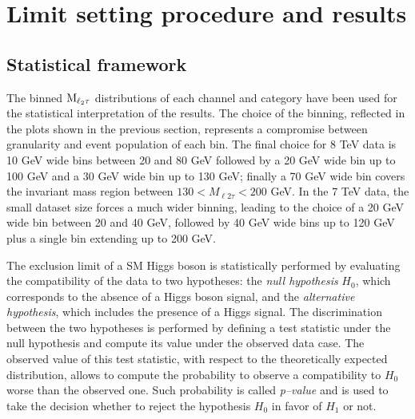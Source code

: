 \begin{table}
\caption{%
Expected event yields for the different background processes and for a 125 GeV WH, $\rm{H}\To\tau\tau$ signal compared to the number of events observed in the data, split by channel and category, for 7 TeV data. The uncertainty quoted on each background process represents statistical plus systematic uncertainty.}

\label{tab:prefit_yields_table_7TeV}
\end{table}


\section{Limit setting procedure and results}

\subsection{Statistical framework}
The binned $\rm{M}_{\ell_2 \tau}$ distributions of each channel and category have been used for the statistical interpretation of the results. The choice of the binning, reflected in the plots shown in the previous section, represents a compromise between granularity and event population of each bin. The final choice for 8 TeV data is 10 GeV wide bins between 20 and 80 GeV followed by a 20 GeV wide bin up to 100 GeV and a 30 GeV wide bin up to 130 GeV; finally a 70 GeV wide bin covers the invariant mass region between $130 < M_{\ell 2 \tau} < 200$ GeV. In the 7 TeV data, the small dataset size forces a much wider binning, leading to the choice of a 20 GeV wide bin between 20 and 40 GeV, followed by 40 GeV wide bins up to 120 GeV plus a single bin extending up to 200 GeV.

The exclusion limit of a SM Higgs boson is statistically performed by evaluating the compatibility of the data to two hypotheses: the \emph{null hypothesis} $H_0$, which corresponds to the absence of a Higgs boson signal, and the  \emph{alternative hypothesis}, which includes the presence of a Higgs signal. The discrimination between the two hypotheses is performed by defining a test statistic under the null hypothesis and compute its value under the observed data case. The observed value of this test statistic, with respect to the theoretically expected distribution, allows to compute the probability to observe a compatibility to $H_0$ worse than the observed one. Such probability is called \emph{p--value} and is used to take the decision whether to reject the hypothesis $H_0$ in favor of $H_1$ or not.

